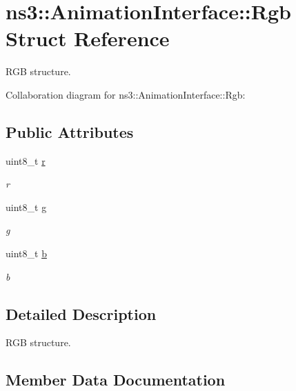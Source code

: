 \hypertarget{structns3_1_1AnimationInterface_1_1Rgb}{}\section{ns3\+:\+:Animation\+Interface\+:\+:Rgb Struct Reference}
\label{structns3_1_1AnimationInterface_1_1Rgb}


R\+GB structure.  




Collaboration diagram for ns3\+:\+:Animation\+Interface\+:\+:Rgb\+:
\subsection*{Public Attributes}
\begin{DoxyCompactItemize}
\item 
uint8\+\_\+t \hyperlink{structns3_1_1AnimationInterface_1_1Rgb_a6826e90b7f64241b637ff9442fff78cd}{r}
\begin{DoxyCompactList}\small\item\em r \end{DoxyCompactList}\item 
uint8\+\_\+t \hyperlink{structns3_1_1AnimationInterface_1_1Rgb_a858948959170b95d1f3fed652bbbc737}{g}
\begin{DoxyCompactList}\small\item\em g \end{DoxyCompactList}\item 
uint8\+\_\+t \hyperlink{structns3_1_1AnimationInterface_1_1Rgb_a31e36a0b4155e94c1b3a489b39fbee13}{b}
\begin{DoxyCompactList}\small\item\em b \end{DoxyCompactList}\end{DoxyCompactItemize}


\subsection{Detailed Description}
R\+GB structure. 

\subsection{Member Data Documentation}
